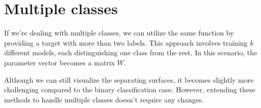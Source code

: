 \section{Multiple classes}

If we're dealing with multiple classes, we can utilize the same function by providing a target with more than two labels. 
This approach involves training $k$ different models, each distinguishing one class from the rest. 
In this scenario, the parameter vector becomes a matrix $W$.

Although we can still visualize the separating surfaces, it becomes slightly more challenging compared to the binary classification case. 
However, extending these methods to handle multiple classes doesn't require any changes.
